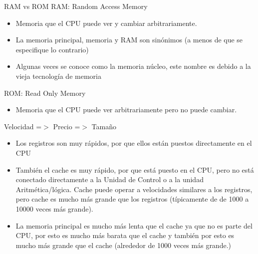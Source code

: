 \documentclass[11pt]{beamer}
\begin{document}
		\begin{frame}{RAM vs ROM}
			RAM: Random Access Memory
			\begin{itemize}
				\item Memoria que el CPU puede ver y cambiar arbitrariamente.
				\item La memoria principal, memoria y RAM son sinónimos (a menos de que se especifique lo contrario)
				\item Algunas veces se conoce como la memoria núcleo, este nombre es debido a la vieja tecnología de memoria
			\end{itemize}
			ROM: Read Only Memory
			\begin{itemize}
				\item Memoria que el CPU puede ver arbitrariamente pero no puede cambiar.
			\end{itemize}
		\end{frame}
		\begin{frame}{Velocidad =$>$ Precio =$>$ Tamaño}
			\begin{itemize}
				\item Los registros son muy rápidos, por que ellos están puestos directamente en el CPU
				\item También el cache es muy rápido, por que está puesto en el CPU, pero no está conectado directamente a la Unidad de Control o a la unidad Aritmética/lógica. Cache puede operar a velocidades similares a los registros, pero cache es mucho más grande que los registros (típicamente de de 1000 a 10000 veces más grande).
				\item La memoria principal es mucho más lenta que el cache ya que no es parte del CPU, por esto es mucho más barata que el cache y también por esto es mucho más grande que el cache (alrededor de 1000 veces más grande.)
			\end{itemize}
		\end{frame}
\end{document}
